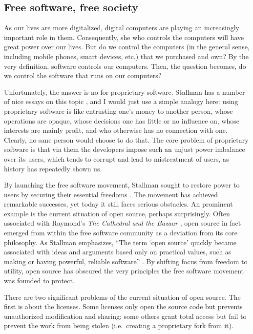 \documentclass[10pt]{article}
\begin{document}
\subsection[Free software, free society]{
Free software, free society\protect\footnotemark}
\label{sec.free.software}

As our lives are more digitalized, digital computers are playing an
increasingly important role in them. Consequently, she who controls the
computers will have great power over our lives. But do we control the computers
(in the general sense, including mobile phones, smart devices, etc.) that we
purchased and own? By the very definition, software controls our computers.
Then, the question becomes, do we control the software that runs on our
computers?

Unfortunately, the answer is no for proprietary software. Stallman
has a number of nice essays on this topic \cite{stallman.essays}, and I would
just use a simple analogy here: using proprietary software is like entrusting
one's money to another person, whose operations are opaque, whose decisions one
has little or no influence on, whose interests are mainly profit, and who
otherwise has no connection with one. Clearly, no sane person would choose to
do that.  The core problem of proprietary software is that via them the
developers impose such an unjust power imbalance over its users, which tends to
corrupt and lead to mistreatment of users, as history has repeatedly shown us.

By launching the free software movement, Stallman sought to restore power to
users by securing their essential freedoms \cite[Essay~1]{stallman.essays}. The
movement has achieved remarkable successes, yet today it still faces serious
obstacles. An prominent example is the current situation of open source,
perhaps surprisingly. Often
associated with Raymond’s \emph{The Cathedral and the Bazaar}
\cite{cathedral.bazaar}, open source in fact emerged from within the free
software community as a deviation from its core philosophy. As Stallman
emphasizes, ``The term `open source' quickly became associated with ideas and
arguments based only on practical values, such as making or having powerful,
reliable software'' \cite[Essay~14]{stallman.essays}. By shifting focus from
freedom to utility, open source has obscured the very principles the free
software movement was founded to protect.

There are two significant problems of the current situation of open source. The
first is about the licenses. Some licenses only open the source code but
prevents unauthorized modification and sharing; some others grant total
access but fail to prevent the work from being stolen (i.e.\ creating a
proprietary fork from it). 
\end{document}
